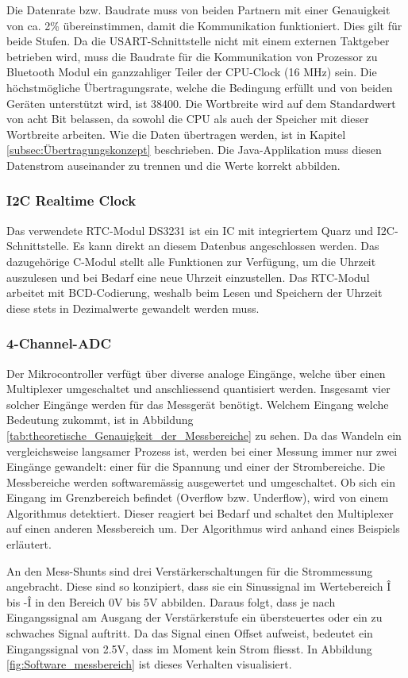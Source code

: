 Die Datenrate bzw. Baudrate muss von beiden Partnern mit einer Genauigkeit von ca. 2\% übereinstimmen, damit die Kommunikation funktioniert. Dies gilt für beide Stufen. Da die USART-Schnittstelle nicht mit einem externen Taktgeber betrieben wird, muss die Baudrate für die Kommunikation von Prozessor zu Bluetooth Modul ein ganzzahliger Teiler der CPU-Clock (16 MHz) sein. Die höchstmögliche Übertragungsrate, welche die Bedingung erfüllt und von beiden Geräten unterstützt wird, ist 38400. Die Wortbreite wird auf dem Standardwert von acht Bit belassen, da sowohl die CPU als auch der Speicher mit dieser Wortbreite arbeiten.
Wie die Daten übertragen werden, ist in Kapitel \ref{subsec:Übertragungskonzept} beschrieben. Die Java-Applikation muss diesen Datenstrom auseinander zu trennen und die Werte korrekt abbilden.  

\subsubsection*{I2C Realtime Clock}
Das verwendete RTC-Modul DS3231 ist ein IC mit integriertem Quarz und I2C-Schnittstelle. Es kann direkt an diesem Datenbus angeschlossen werden. Das dazugehörige C-Modul stellt alle Funktionen zur Verfügung, um die Uhrzeit auszulesen und bei Bedarf eine neue Uhrzeit einzustellen. Das RTC-Modul arbeitet mit BCD-Codierung, weshalb beim Lesen und Speichern der Uhrzeit diese stets in Dezimalwerte gewandelt werden muss.

\subsubsection*{4-Channel-ADC}
Der Mikrocontroller verfügt über diverse analoge Eingänge, welche über einen Multiplexer umgeschaltet und anschliessend quantisiert werden. Insgesamt vier solcher Eingänge werden für das Messgerät benötigt. Welchem Eingang welche Bedeutung zukommt, ist in Abbildung \ref{tab:theoretische_Genauigkeit_der_Messbereiche} zu sehen. Da das Wandeln ein vergleichsweise langsamer Prozess ist, werden bei einer Messung immer nur zwei Eingänge gewandelt: einer für die Spannung und einer der Strombereiche. Die Messbereiche werden softwaremässig ausgewertet und umgeschaltet. Ob sich ein Eingang im Grenzbereich befindet (Overflow bzw. Underflow), wird von einem Algorithmus detektiert. Dieser reagiert bei Bedarf und schaltet den Multiplexer auf einen anderen Messbereich um. Der Algorithmus wird anhand eines Beispiels erläutert.

An den Mess-Shunts sind drei Verstärkerschaltungen für die Strommessung angebracht. Diese sind so konzipiert, dass sie ein Sinussignal im Wertebereich \^{I} bis -\^{I} in den Bereich 0V bis 5V abbilden. Daraus folgt, dass je nach Eingangssignal am Ausgang der Verstärkerstufe ein übersteuertes oder ein zu schwaches Signal auftritt. Da das Signal einen Offset aufweist, bedeutet ein Eingangssignal von 2.5V, dass im Moment kein Strom fliesst. In Abbildung \ref{fig:Software_messbereich} ist dieses Verhalten visualisiert.


